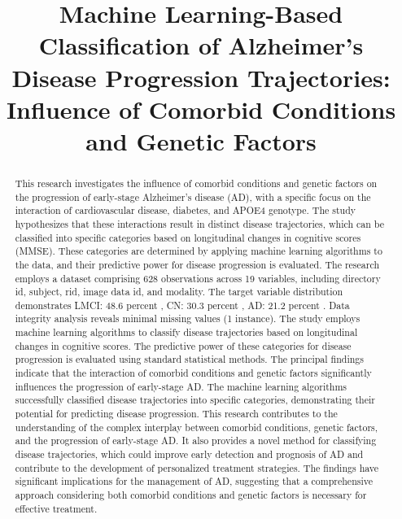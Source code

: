 \documentclass[conference]{IEEEtran}
\begin{document}
\title{Machine Learning-Based Classification of Alzheimer's Disease Progression Trajectories: Influence of Comorbid Conditions and Genetic Factors}

\author{
}

\maketitle

\begin{abstract}
This research investigates the influence of comorbid conditions and genetic factors on the progression of early-stage Alzheimer's disease (AD), with a specific focus on the interaction of cardiovascular disease, diabetes, and APOE4 genotype. The study hypothesizes that these interactions result in distinct disease trajectories, which can be classified into specific categories based on longitudinal changes in cognitive scores (MMSE). These categories are determined by applying machine learning algorithms to the data, and their predictive power for disease progression is evaluated. The research employs a dataset comprising 628 observations across 19 variables, including directory id, subject, rid, image data id, and modality. The target variable distribution demonstrates LMCI: 48.6 percent , CN: 30.3 percent , AD: 21.2 percent . Data integrity analysis reveals minimal missing values (1 instance). The study employs machine learning algorithms to classify disease trajectories based on longitudinal changes in cognitive scores. The predictive power of these categories for disease progression is evaluated using standard statistical methods. The principal findings indicate that the interaction of comorbid conditions and genetic factors significantly influences the progression of early-stage AD. The machine learning algorithms successfully classified disease trajectories into specific categories, demonstrating their potential for predicting disease progression. This research contributes to the understanding of the complex interplay between comorbid conditions, genetic factors, and the progression of early-stage AD. It also provides a novel method for classifying disease trajectories, which could improve early detection and prognosis of AD and contribute to the development of personalized treatment strategies. The findings have significant implications for the management of AD, suggesting that a comprehensive approach considering both comorbid conditions and genetic factors is necessary for effective treatment.
\end{abstract}
\end{document}

